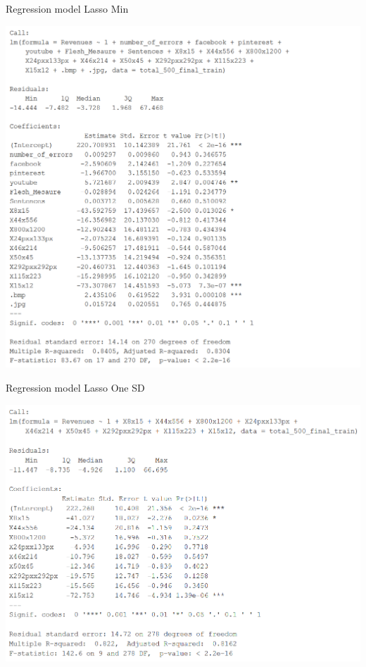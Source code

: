 \documentclass{book}
\begin{document}
\begin{table}[H]
\centering
\caption{Regression model Lasso Min}\label{d :r :3}
\begin{center}
\includegraphics[scale=0.8]{../R/photos/72_full3.PNG}   \\
\end{center}
\end{table}


\begin{table}[H]
\centering
\caption{Regression model Lasso One SD}\label{d :r :4}
\begin{center}
\includegraphics[scale=0.8]{../R/photos/77_full4.PNG}   \\
\end{center}
\end{table}
\end{document}
